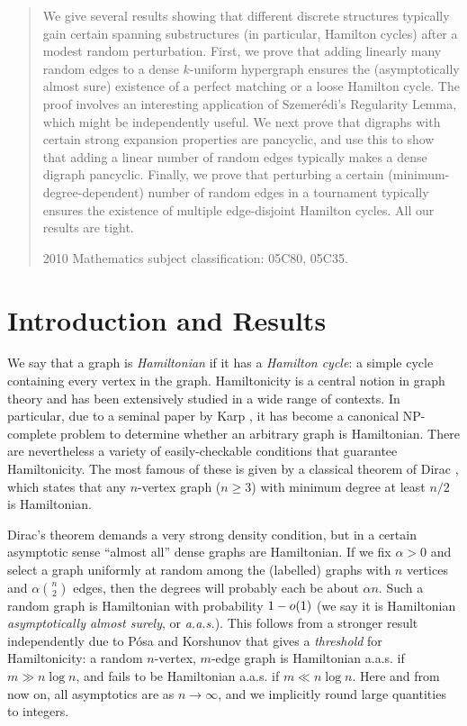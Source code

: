 \documentclass[11pt,english]{article}
\theoremstyle{plain}
\theoremstyle{definition}
\theoremstyle{definition}
\theoremstyle{plain}
\theoremstyle{plain}
\theoremstyle{plain}
\theoremstyle{plain}
\theoremstyle{remark}
\theoremstyle{remark}
\let\originalleft\left
\let\originalright\right
\renewcommand{\left}{\mathopen{}\mathclose\bgroup\originalleft}
\renewcommand{\right}{\aftergroup\egroup\originalright}
\begin{document}
\begin{abstract}
We give several results showing that different discrete structures typically
gain certain spanning substructures (in particular, Hamilton cycles) after a modest random perturbation. First, we prove
that adding linearly many random edges to a dense $k$-uniform hypergraph ensures
the (asymptotically almost sure) existence of a perfect matching or a loose
Hamilton cycle. The proof involves an interesting application of Szemer\'edi's
Regularity Lemma, which might be independently useful. We next prove that digraphs with certain strong expansion
properties are pancyclic, and use this to show that adding a linear
number of random edges typically makes a dense digraph pancyclic. Finally, we
prove that perturbing a certain (minimum-degree-dependent) number of
random edges in a tournament typically ensures the existence of multiple edge-disjoint
Hamilton cycles. All our results are tight.

2010 Mathematics subject classification:
05C80, %
05C35.%

\end{abstract}

\section{Introduction and Results}

We say that a graph is \emph{Hamiltonian} if it has a \emph{Hamilton
cycle}: a simple cycle containing every vertex in the graph. Hamiltonicity
is a central notion in graph theory and has been extensively studied
in a wide range of contexts. In particular, due to a seminal paper
by Karp \cite{Kar72}, it has become a canonical NP-complete problem
to determine whether an arbitrary graph is Hamiltonian. There are
nevertheless a variety of easily-checkable conditions that guarantee
Hamiltonicity. The most famous of these is given by a classical theorem
of Dirac \cite{Dir52}, which states that any $n$-vertex graph ($n\ge 3$) with
minimum degree at least $n/2$ is Hamiltonian.

Dirac's theorem demands a very strong density condition, but in a
certain asymptotic sense ``almost all'' dense graphs are Hamiltonian.
If we fix $\alpha>0$ and select a graph uniformly at random among
the (labelled) graphs with $n$ vertices and $\alpha{n \choose 2}$
edges, then the degrees will probably each be about $\alpha n$. Such
a random graph is Hamiltonian with probability $1-o\left(1\right)$
(we say it is Hamiltonian \emph{asymptotically almost surely}, or
\emph{a.a.s.}). This follows from a stronger result independently due to P\'osa \cite{Pos76} and Korshunov \cite{Kor76}
that gives a \emph{threshold} for Hamiltonicity: a random $n$-vertex,
$m$-edge graph is Hamiltonian a.a.s.{} if $m\gg n\log n$, and fails
to be Hamiltonian a.a.s.{} if $m\ll n\log n$. Here and from now on,
all asymptotics are as $n\to\infty$, and we implicitly round large
quantities to integers.
\end{document}
